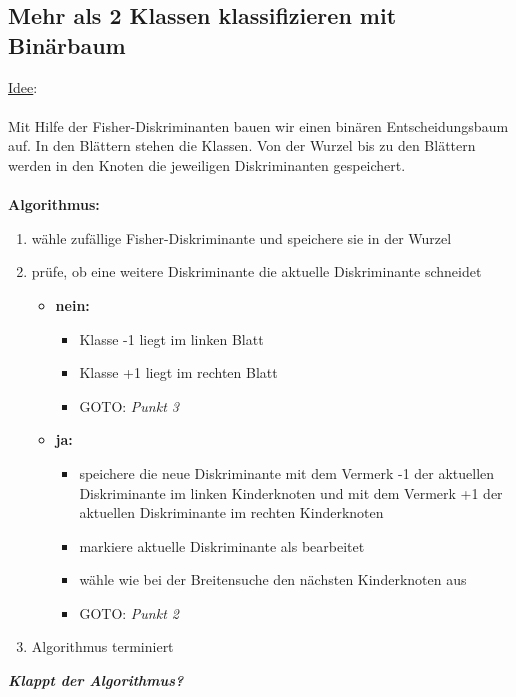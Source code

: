 \documentclass[12pt]{article}
\begin{document}
\newpage

\subsection{Mehr als 2 Klassen klassifizieren mit Bin\"arbaum}

\underline{Idee}:\\
\\
Mit Hilfe der Fisher-Diskriminanten bauen wir einen bin\"aren Entscheidungsbaum auf. In den Bl\"attern stehen die Klassen. Von der Wurzel bis zu den Bl\"attern werden in den Knoten die jeweiligen Diskriminanten gespeichert.\\
\\
\textbf{Algorithmus:}
\begin{enumerate}
\item w\"ahle zuf\"allige Fisher-Diskriminante und speichere sie in der Wurzel
\item pr\"ufe, ob eine weitere Diskriminante die aktuelle Diskriminante schneidet
	\begin{itemize}
	\item \textbf{nein:}
		\begin{itemize}
		\item Klasse -1 liegt im linken Blatt
		\item Klasse +1 liegt im rechten Blatt
		\item GOTO: \textit{Punkt 3}
		\end{itemize}
	\item \textbf{ja:}
		\begin{itemize}

		\item speichere die neue Diskriminante mit dem Vermerk -1 der aktuellen Diskriminante im linken Kinderknoten und mit dem Vermerk +1 der aktuellen Diskriminante im rechten Kinderknoten
		\item markiere aktuelle Diskriminante als bearbeitet
		\item w\"ahle wie bei der Breitensuche den n\"achsten Kinderknoten aus
		\item GOTO: \textit{Punkt 2}
		\end{itemize}
	\end{itemize}
\item Algorithmus terminiert
\end{enumerate}

\textbf{\textit{Klappt der Algorithmus?}}
\end{document}

